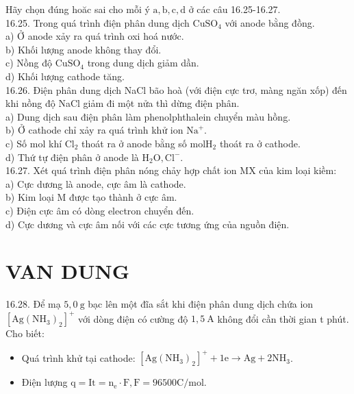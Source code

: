 \documentclass[10pt]{article}
\begin{document}
Hãy chọn đúng hoăc sai cho mỗi ý $\mathrm{a}, \mathrm{b}, \mathrm{c}, \mathrm{d}$ ở các câu 16.25-16.27.\\
16.25. Trong quá trình điện phân dung dịch $\mathrm{CuSO}_{4}$ với anode bằng đồng.\\
a) Ở anode xảy ra quá trình oxi hoá nước.\\
b) Khối lượng anode không thay đổi.\\
c) Nồng độ $\mathrm{CuSO}_{4}$ trong dung dịch giảm dần.\\
d) Khối lượng cathode tăng.\\
16.26. Điện phân dung dịch NaCl bão hoà (với điện cực trơ, màng ngăn xốp) đến khi nồng độ NaCl giảm đi một nửa thì dừng điện phân.\\
a) Dung dịch sau điện phân làm phenolphthalein chuyển màu hồng.\\
b) Ở cathode chỉ xảy ra quá trình khử ion $\mathrm{Na}^{+}$.\\
c) Số mol khí $\mathrm{Cl}_{2}$ thoát ra ở anode bằng số $\mathrm{mol} \mathrm{H}_{2}$ thoát ra ở cathode.\\
d) Thứ tự điện phân ở anode là $\mathrm{H}_{2} \mathrm{O}, \mathrm{Cl}^{-}$.\\
16.27. Xét quá trình điện phân nóng chảy hợp chất ion MX của kim loại kiềm:\\
a) Cực dương là anode, cực âm là cathode.\\
b) Kim loại M được tạo thành ở cực âm.\\
c) Điện cực âm có dòng electron chuyển đến.\\
d) Cực dương và cực âm nối với các cực tương ứng của nguồn điện.

\section*{VAN DUNG}
16.28. Để mạ $5,0 \mathrm{~g}$ bạc lên một đĩa sắt khi điện phân dung dịch chứa ion $\left[\mathrm{Ag}\left(\mathrm{NH}_{3}\right)_{2}\right]^{+}$ với dòng điện có cường độ $1,5 \mathrm{~A}$ không đổi cần thời gian t phút.\\
Cho biết:

\begin{itemize}
  \item Quá trình khử tại cathode: $\left[\mathrm{Ag}\left(\mathrm{NH}_{3}\right)_{2}\right]^{+}+1 \mathrm{e} \rightarrow \mathrm{Ag}+2 \mathrm{NH}_{3}$.
  \item Điện lượng $\mathrm{q}=\mathrm{It}=\mathrm{n}_{\mathrm{e}} \cdot \mathrm{F}, \mathrm{F}=96500 \mathrm{C} / \mathrm{mol}$.
\end{itemize}
\end{document}
